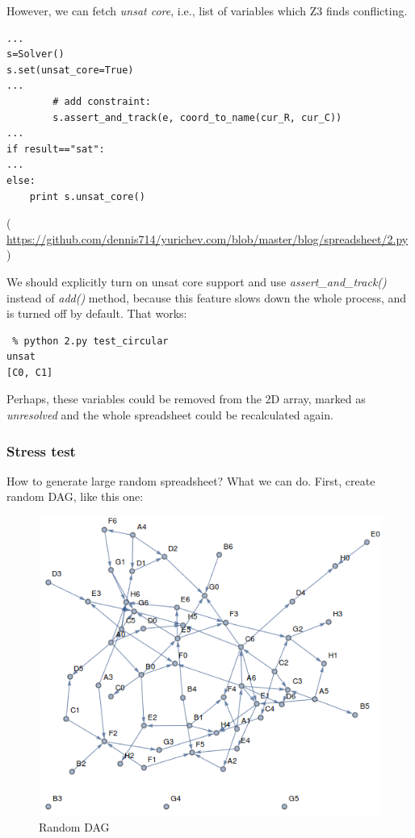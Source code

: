 However, we can fetch \textit{unsat core}, i.e., list of variables which Z3 finds conflicting.

\begin{lstlisting}
...
s=Solver()
s.set(unsat_core=True)
...
        # add constraint:
        s.assert_and_track(e, coord_to_name(cur_R, cur_C))
...
if result=="sat":
...
else:
    print s.unsat_core()
\end{lstlisting}

( \url{https://github.com/dennis714/yurichev.com/blob/master/blog/spreadsheet/2.py} )

We should explicitly turn on unsat core support and use \textit{assert\_and\_track()} instead of \textit{add()} method,
because this feature slows down the whole process, and is turned off by default.
That works:

\begin{lstlisting}
 % python 2.py test_circular
unsat
[C0, C1]
\end{lstlisting}

Perhaps, these variables could be removed from the 2D array, marked as \textit{unresolved}
and the whole spreadsheet could be recalculated again.

\subsubsection{Stress test}

How to generate large random spreadsheet?
What we can do.
First, create random \ac{DAG}, like this one:

\begin{figure}[H]
\centering
\includegraphics[width=\textwidth]{SMT/spreadsheet/1.png}
\caption{Random DAG}
\end{figure}

